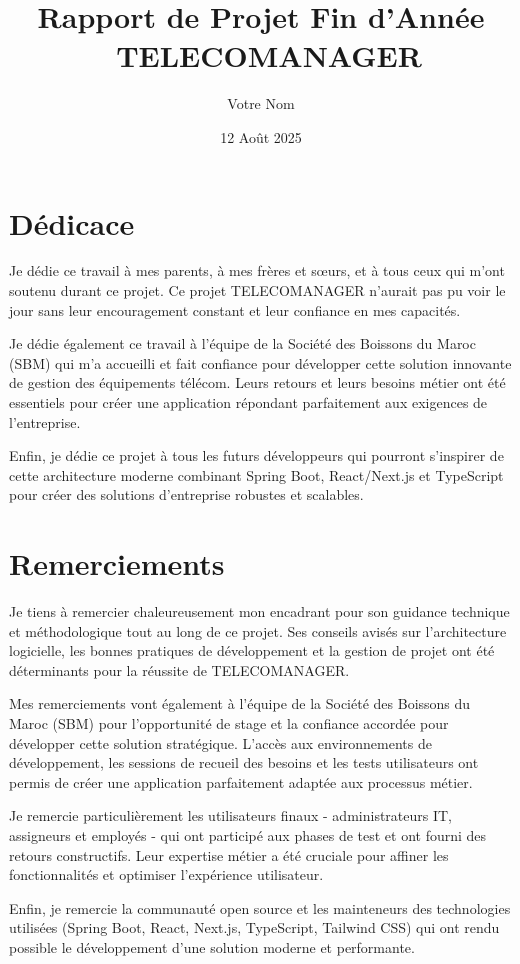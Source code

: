 \documentclass[12pt,a4paper]{report}
\title{Rapport de Projet Fin d'Année \ TELECOMANAGER}
\author{Votre Nom}
\date{12 Août 2025}
\begin{document}
\maketitle
\chapter*{Dédicace}
Je dédie ce travail à mes parents, à mes frères et sœurs, et à tous ceux qui m'ont soutenu durant ce projet. Ce projet TELECOMANAGER n'aurait pas pu voir le jour sans leur encouragement constant et leur confiance en mes capacités. 

Je dédie également ce travail à l'équipe de la Société des Boissons du Maroc (SBM) qui m'a accueilli et fait confiance pour développer cette solution innovante de gestion des équipements télécom. Leurs retours et leurs besoins métier ont été essentiels pour créer une application répondant parfaitement aux exigences de l'entreprise.

Enfin, je dédie ce projet à tous les futurs développeurs qui pourront s'inspirer de cette architecture moderne combinant Spring Boot, React/Next.js et TypeScript pour créer des solutions d'entreprise robustes et scalables.

\chapter*{Remerciements}
Je tiens à remercier chaleureusement mon encadrant pour son guidance technique et méthodologique tout au long de ce projet. Ses conseils avisés sur l'architecture logicielle, les bonnes pratiques de développement et la gestion de projet ont été déterminants pour la réussite de TELECOMANAGER.

Mes remerciements vont également à l'équipe de la Société des Boissons du Maroc (SBM) pour l'opportunité de stage et la confiance accordée pour développer cette solution stratégique. L'accès aux environnements de développement, les sessions de recueil des besoins et les tests utilisateurs ont permis de créer une application parfaitement adaptée aux processus métier.

Je remercie particulièrement les utilisateurs finaux - administrateurs IT, assigneurs et employés - qui ont participé aux phases de test et ont fourni des retours constructifs. Leur expertise métier a été cruciale pour affiner les fonctionnalités et optimiser l'expérience utilisateur.

Enfin, je remercie la communauté open source et les mainteneurs des technologies utilisées (Spring Boot, React, Next.js, TypeScript, Tailwind CSS) qui ont rendu possible le développement d'une solution moderne et performante.
\end{document}
